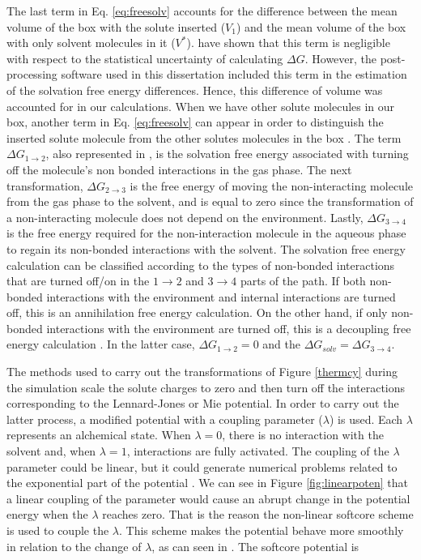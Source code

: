     The last term in Eq. \ref{eq:freesolv} accounts for the difference between the mean volume of the box with the solute inserted ($V_{1}$) and the mean volume of the box with only solvent molecules in it ($V^{*}$).  have shown that this term is negligible with respect to the statistical uncertainty of calculating $\Delta G$. However, the post-processing software used in this dissertation included this term in the estimation of the solvation free energy differences. Hence, this difference of volume was accounted for in our calculations. When we have other solute molecules in our box, another term in Eq. \ref{eq:freesolv} can appear in order to distinguish the inserted solute molecule from the other solutes molecules in the box \cite{shirts2013}. The  term $\Delta G_{1 \rightarrow 2}$, also represented in ,  is the solvation free energy associated with turning off the molecule's non bonded interactions in the gas phase. The next transformation, $\Delta G_{2 \rightarrow 3}$ is the free energy of moving the non-interacting molecule from the gas phase to the solvent, and is equal to zero since the transformation of a non-interacting molecule does not depend on the environment. Lastly, $\Delta G_{3 \rightarrow 4}$ is the free energy required for the non-interaction molecule in the aqueous phase to regain its non-bonded interactions with the solvent.  The solvation free energy calculation can be classified according to the types of non-bonded interactions that are turned off/on in the $1 \rightarrow 2$ and $ 3 \rightarrow 4$ parts of the path. If both non-bonded interactions with the environment and internal interactions are turned off, this is an annihilation free energy calculation. On the other hand, if only non-bonded interactions with the environment are turned off, this is a decoupling free energy calculation \cite{klimovich}. In the latter case, $\Delta G_{1 \rightarrow 2} = 0$ and the $\Delta G_{solv} = \Delta G_{3 \rightarrow 4} $.  
    
    The methods used to carry out the transformations of Figure \ref{thermcy} during the simulation scale the solute charges to zero and then turn off the interactions corresponding to the Lennard-Jones or Mie potential. In order to carry out the latter process, a modified potential with a coupling parameter ($\lambda$) is used. Each $\lambda$ represents an alchemical state. When $\lambda=0$, there is no interaction with the solvent and, when $\lambda=1$, interactions are fully activated. The coupling of the $\lambda$ parameter could be linear, but it could generate numerical problems related to the exponential part of the potential \cite{shirts2013}. We can see in Figure \ref{fig:linearpoten} that a linear coupling of the parameter would cause an abrupt change in the potential energy when the $\lambda$ reaches zero. That is the reason the non-linear softcore scheme \cite{beutler1994} is used to couple the $\lambda$. This scheme makes the potential behave more smoothly in relation to the change of $\lambda$, as can seen in . The softcore potential is  
    
